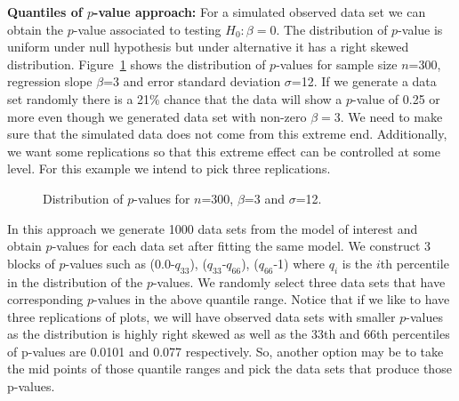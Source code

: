 \documentclass[11pt]{article}
\begin{document}
{\bf Quantiles of $p$-value approach:} For a simulated observed data set we can obtain the $p$-value associated to testing $H_0: \beta=0$. The distribution of $p$-value is uniform under null hypothesis but under alternative it has a right skewed distribution. Figure~\ref{fig:dist_pvalue} shows the distribution  of $p$-values for sample size $n$=300, regression slope $\beta$=3 and error standard deviation $\sigma$=12. If we generate a data set randomly there is a 21\% chance that the data will show a $p$-value of 0.25 or more even though we generated data set with non-zero $\beta=3$. We need to make sure that the simulated data does not come from this extreme end. Additionally, we want some replications so that this extreme effect can be controlled at some level. For this example we intend to pick three replications.


\begin{figure}[hbtp]
   \centering
       \caption{Distribution of $p$-values for $n$=300, $\beta$=3 and $\sigma$=12.}
       \label{fig:dist_pvalue}
\end{figure}

In this approach we generate 1000 data sets from the model of interest and obtain $p$-values for each data set after fitting the same model. We construct 3 blocks of $p$-values such as (0.0-$q_{33}$), ($q_{33}$-$q_{66}$), ($q_{66}$-1) where $q_i$ is the $i$th percentile in the distribution of the $p$-values. We randomly select three data sets that have corresponding $p$-values in the above quantile range.  Notice that if we like to have three replications of plots, we will have observed data sets with smaller $p$-values as the distribution is highly right skewed as well as the 33th and 66th percentiles of p-values are 0.0101 and 0.077 respectively. So, another option may be to take the mid points of those quantile ranges and pick the data sets that produce those p-values. \\
\end{document}
